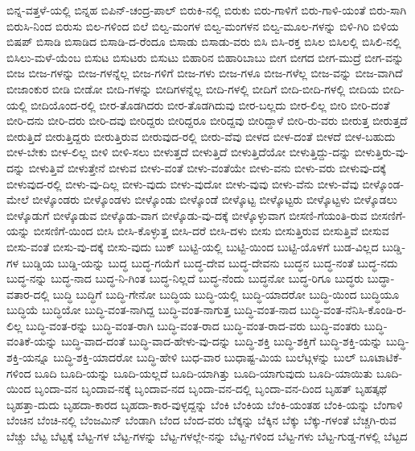 {ಬಿನ್ನ-ವತ್ತಳೆ-ಯಲ್ಲಿ
ಬಿನ್ನಹ
ಬಿಪಿನ್-ಚಂದ್ರ-ಪಾಲ್
ಬಿರುಕಿ-ನಲ್ಲಿ
ಬಿರುಕು
ಬಿರು-ಗಾಳಿಗೆ
ಬಿರು-ಗಾಳಿ-ಯಂತೆ
ಬಿರು-ಸಾಗಿ
ಬಿರುಸಿ-ನಿಂದ
ಬಿರುಸು
ಬಿಲ-ಗಳಿಂದ
ಬಿಲೆ
ಬಿಲ್ವ-ಮಂಗಳ
ಬಿಲ್ವ-ಮಂಗಳನ
ಬಿಲ್ವ-ಮೂಲ-ಗಳನ್ನು
ಬಿಳಿ-ಗಿರಿ
ಬಿಳಿಯ
ಬಿಷಪ್
ಬಿಸಾಡಿ
ಬಿಸಾಡಿದ
ಬಿಸಾಡಿ-ದ-ರೆಂದೂ
ಬಿಸಾಡು
ಬಿಸಾಡು-ವರು
ಬಿಸಿ
ಬಿಸಿ-ರಕ್ತ
ಬಿಸಿಲ
ಬಿಸಿಲಲ್ಲಿ
ಬಿಸಿಲಿ-ನಲ್ಲಿ
ಬಿಸಿಲು-ಮಳೆ-ಯೆಂಬ
ಬಿಸುಟ
ಬಿಸುಟರು
ಬಿಸುಟು
ಬಿಹಾರಿನ
ಬಿಹಾರಿಬಾಬು
ಬೀಗ
ಬೀಗದ
ಬೀಗ-ಮುದ್ರೆ
ಬೀಗ-ವನ್ನು
ಬೀಜ
ಬೀಜ-ಗಳನ್ನು
ಬೀಜ-ಗಳನ್ನೆಲ್ಲ
ಬೀಜ-ಗಳಿಗೆ
ಬೀಜ-ಗಳು
ಬೀಜ-ಗಳೂ
ಬೀಜ-ಗಳೆಲ್ಲ
ಬೀಜ-ವನ್ನು
ಬೀಜ-ವಾಗಿದೆ
ಬೀಜಾಂಕುರ
ಬೀಡಿ
ಬೀಡೋ
ಬೀದಿ-ಗಳನ್ನು
ಬೀದಿಗಳನ್ನೆಲ್ಲ
ಬೀದಿ-ಗಳಲ್ಲಿ
ಬೀದಿಗೆ
ಬೀದಿ-ಬೀದಿ-ಗಳಲ್ಲಿ
ಬೀದಿಯ
ಬೀದಿ-ಯಲ್ಲಿ
ಬೀದಿಯೊಂದ-ರಲ್ಲಿ
ಬೀರ-ತೊಡಗಿದರು
ಬೀರ-ತೊಡಗಿದುವು
ಬೀರ-ಬಲ್ಲದು
ಬೀರ-ಲಿಲ್ಲ
ಬೀರಿ
ಬೀರಿ-ದಂತೆ
ಬೀರಿ-ದನು
ಬೀರಿ-ದರು
ಬೀರಿ-ದವು
ಬೀರಿದ್ದರು
ಬೀರಿದ್ದರೂ
ಬೀರಿದ್ದವು
ಬೀರಿದ್ದಾಳೆ
ಬೀರಿ-ರು-ವರು
ಬೀರುತ್ತ
ಬೀರುತ್ತದೆ
ಬೀರುತ್ತಿದೆ
ಬೀರುತ್ತಿದ್ದರು
ಬೀರುತ್ತಿರುವ
ಬೀರುವುದ-ರಲ್ಲಿ
ಬೀರು-ವೆವು
ಬೀಳದ
ಬೀಳ-ದಂತೆ
ಬೀಳದೆ
ಬೀಳ-ಬಹುದು
ಬೀಳ-ಬೇಕು
ಬೀಳ-ಲಿಲ್ಲ
ಬೀಳಿ
ಬೀಳಿ-ಸಲು
ಬೀಳುತ್ತದೆ
ಬೀಳುತ್ತಿದೆ
ಬೀಳುತ್ತಿದೆಯೋ
ಬೀಳುತ್ತಿದ್ದು-ದನ್ನು
ಬೀಳುತ್ತಿರು-ವು-ದನ್ನು
ಬೀಳುತ್ತಿವೆ
ಬೀಳುತ್ತೇನೆ
ಬೀಳುವ
ಬೀಳು-ವಂತೆ
ಬೀಳು-ವಂತೆಯೇ
ಬೀಳು-ವನು
ಬೀಳು-ವರು
ಬೀಳುವು-ದಕ್ಕೆ
ಬೀಳುವುದ-ರಲ್ಲಿ
ಬೀಳು-ವು-ದಿಲ್ಲ
ಬೀಳು-ವುದು
ಬೀಳು-ವುದೋ
ಬೀಳು-ವುವು
ಬೀಳು-ವೆನು
ಬೀಳು-ವೆವು
ಬೀಳ್ಕೊಂಡ-ಮೇಲೆ
ಬೀಳ್ಕೊಂಡರು
ಬೀಳ್ಕೊಂಡಳು
ಬೀಳ್ಕೊಂಡು
ಬೀಳ್ಕೊಂಡೆ
ಬೀಳ್ಕೊಟ್ಟ
ಬೀಳ್ಕೊಟ್ಟರು
ಬೀಳ್ಕೊಟ್ಟಳು
ಬೀಳ್ಕೊಡಲು
ಬೀಳ್ಕೊಡುಗೆ
ಬೀಳ್ಕೊಡುವ
ಬೀಳ್ಕೊಡು-ವಾಗ
ಬೀಳ್ಕೊಡು-ವು-ದಕ್ಕೆ
ಬೀಳ್ಕೊಳ್ಳುವಾಗ
ಬೀಸಣಿ-ಗೆಯಂತಿ-ರುವ
ಬೀಸಣಿಗೆ-ಯನ್ನು
ಬೀಸಣಿಗೆ-ಯಿಂದ
ಬೀಸಿ
ಬೀಸಿ-ಕೊಳ್ಳುತ್ತ
ಬೀಸಿ-ದರೆ
ಬೀಸಿ-ದಳು
ಬೀಸು
ಬೀಸುತ್ತಿರುವ
ಬೀಸುತ್ತಿವೆ
ಬೀಸುವ
ಬೀಸು-ವಂತೆ
ಬೀಸು-ವು-ದಕ್ಕೆ
ಬೀಸು-ವುದು
ಬುಕ್
ಬುಟ್ಟಿ-ಯಲ್ಲಿ
ಬುಟ್ಟಿ-ಯಿಂದ
ಬುಟ್ಟಿ-ಯೊಳಗೆ
ಬುಡ-ವಿಲ್ಲದ
ಬುಡ್ಡಿ-ಗಳ
ಬುಡ್ಡಿಯ
ಬುಡ್ಡಿ-ಯನ್ನು
ಬುದ್ಧ
ಬುದ್ಧ-ಗಯೆಗೆ
ಬುದ್ಧ-ದೇವ
ಬುದ್ಧ-ದೇವನು
ಬುದ್ಧನ
ಬುದ್ಧ-ನಂತೆ
ಬುದ್ಧ-ನದು
ಬುದ್ಧ-ನನ್ನು
ಬುದ್ಧ-ನಾದ
ಬುದ್ಧ-ನಿ-ಗಿಂತ
ಬುದ್ಧ-ನಿಲ್ಲದೆ
ಬುದ್ಧ-ನೆಂದು
ಬುದ್ಧನೋ
ಬುದ್ಧ-ರಿಗೂ
ಬುದ್ಧರು
ಬುದ್ಧಾ-ವತಾರ-ದಲ್ಲಿ
ಬುದ್ಧಿ
ಬುದ್ಧಿಗೆ
ಬುದ್ಧಿ-ಗೇನೋ
ಬುದ್ಧಿಯ
ಬುದ್ಧಿ-ಯಲ್ಲಿ
ಬುದ್ಧಿ-ಯಾದರೋ
ಬುದ್ಧಿ-ಯಿಂದ
ಬುದ್ಧಿಯೂ
ಬುದ್ಧಿಯೆ
ಬುದ್ಧಿಯೋ
ಬುದ್ಧಿ-ವಂತ-ನಾಗಿದ್ದ
ಬುದ್ಧಿ-ವಂತ-ನಾಗುತ್ತ
ಬುದ್ಧಿ-ವಂತ-ನಾದ
ಬುದ್ಧಿ-ವಂತ-ನೆನಿಸಿ-ಕೊಂಡಿ-ರ-ಲಿಲ್ಲ
ಬುದ್ಧಿ-ವಂತ-ರನ್ನು
ಬುದ್ಧಿ-ವಂತ-ರಾಗಿ
ಬುದ್ಧಿ-ವಂತ-ರಾದ
ಬುದ್ಧಿ-ವಂತ-ರಾದ-ವರು
ಬುದ್ಧಿ-ವಂತರು
ಬುದ್ಧಿ-ವಂತಿಕೆ-ಯನ್ನು
ಬುದ್ಧಿ-ವಾದ-ದಂತೆ
ಬುದ್ಧಿ-ವಾದ-ಹೇಳು-ವು-ದನ್ನು
ಬುದ್ಧಿ-ಶಕ್ತಿ
ಬುದ್ಧಿ-ಶಕ್ತಿಗೆ
ಬುದ್ಧಿ-ಶಕ್ತಿ-ಯನ್ನು
ಬುದ್ಧಿ-ಶಕ್ತಿ-ಯನ್ನೂ
ಬುದ್ಧಿ-ಶಕ್ತಿ-ಯಾದರೋ
ಬುದ್ಧಿ-ಹೇಳಿ
ಬುಧ-ವಾರ
ಬುಧಾಷ್ಟ-ಮಿಯ
ಬುಲೆಟ್ಗಳನ್ನು
ಬುಲ್
ಬೂಟಾಟಿಕೆ-ಗಳಿಂದ
ಬೂದಿ
ಬೂದಿ-ಯನ್ನು
ಬೂದಿ-ಯಲ್ಲದೆ
ಬೂದಿ-ಯಾಗಿತ್ತು
ಬೂದಿ-ಯಾಗುವುದು
ಬೂದಿ-ಯಾಯಿತು
ಬೂದಿ-ಯಿಂದ
ಬೃಂದಾ-ವನ
ಬೃಂದಾವ-ನಕ್ಕೆ
ಬೃಂದಾವ-ನದ
ಬೃಂದಾ-ವನ-ದಲ್ಲಿ
ಬೃಂದಾ-ವನ-ದಿಂದ
ಬೃಹತ್
ಬೃಹತ್ಕಥೆ
ಬೃಹತ್ತಾ-ದುದು
ಬೃಹದಾ-ಕಾರದ
ಬೃಹದಾ-ಕಾರ-ವುಳ್ಳದ್ದನ್ನು
ಬೆಂಕಿ
ಬೆಂಕಿಯ
ಬೆಂಕಿ-ಯಂತಹ
ಬೆಂಕಿ-ಯನ್ನು
ಬೆಂಗಾಳಿ
ಬೆಂಚಿನ
ಬೆಂಚಿ-ನಲ್ಲಿ
ಬೆಂಜಮಿನ್
ಬೆಂಡಾಗಿ
ಬೆಂದ
ಬೆಂದ-ವರು
ಬೆಕ್ಕನ್ನು
ಬೆಕ್ಕಿನ
ಬೆಕ್ಕು
ಬೆಕ್ಕು-ಗಳಂತೆ
ಬೆಚ್ಚಗಿ-ರುವ
ಬೆಚ್ಚು
ಬೆಟ್ಟ
ಬೆಟ್ಟಕ್ಕೆ
ಬೆಟ್ಟ-ಗಳ
ಬೆಟ್ಟ-ಗಳನ್ನು
ಬೆಟ್ಟ-ಗಳಲ್ಲೇ-ನನ್ನು
ಬೆಟ್ಟ-ಗಳಿಂದ
ಬೆಟ್ಟ-ಗಳು
ಬೆಟ್ಟ-ಗುಡ್ಡ-ಗಳಲ್ಲಿ
ಬೆಟ್ಟದ
}
